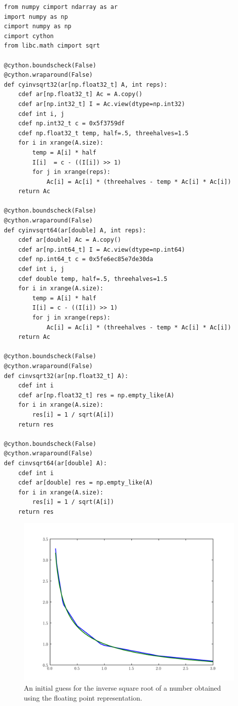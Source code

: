 \begin{lstlisting}
from numpy cimport ndarray as ar
import numpy as np
cimport numpy as np
cimport cython
from libc.math cimport sqrt

@cython.boundscheck(False)
@cython.wraparound(False)
def cyinvsqrt32(ar[np.float32_t] A, int reps):
    cdef ar[np.float32_t] Ac = A.copy()
    cdef ar[np.int32_t] I = Ac.view(dtype=np.int32)
    cdef int i, j
    cdef np.int32_t c = 0x5f3759df
    cdef np.float32_t temp, half=.5, threehalves=1.5
    for i in xrange(A.size):
        temp = A[i] * half
        I[i]  = c - ((I[i]) >> 1)
        for j in xrange(reps):
            Ac[i] = Ac[i] * (threehalves - temp * Ac[i] * Ac[i])
    return Ac

@cython.boundscheck(False)
@cython.wraparound(False)
def cyinvsqrt64(ar[double] A, int reps):
    cdef ar[double] Ac = A.copy()
    cdef ar[np.int64_t] I = Ac.view(dtype=np.int64)
    cdef np.int64_t c = 0x5fe6ec85e7de30da
    cdef int i, j
    cdef double temp, half=.5, threehalves=1.5
    for i in xrange(A.size):
        temp = A[i] * half
        I[i] = c - ((I[i]) >> 1)
        for j in xrange(reps):
            Ac[i] = Ac[i] * (threehalves - temp * Ac[i] * Ac[i])
    return Ac

@cython.boundscheck(False)
@cython.wraparound(False)
def cinvsqrt32(ar[np.float32_t] A):
    cdef int i
    cdef ar[np.float32_t] res = np.empty_like(A)
    for i in xrange(A.size):
        res[i] = 1 / sqrt(A[i])
    return res

@cython.boundscheck(False)
@cython.wraparound(False)
def cinvsqrt64(ar[double] A):
    cdef int i
    cdef ar[double] res = np.empty_like(A)
    for i in xrange(A.size):
        res[i] = 1 / sqrt(A[i])
    return res
\end{lstlisting}

\begin{figure}
\includegraphics[width=\textwidth]{invsqrt0}
\caption{An initial guess for the inverse square root of a number obtained using the floating point representation.}
\label{float:invsqrt0}
\end{figure}

